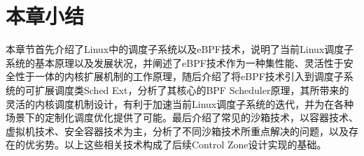 \section{本章小结}

本章节首先介绍了Linux中的调度子系统以及eBPF技术，说明了当前Linux调度子系统的基本原理以及发展状况，并阐述了eBPF技术作为一种集性能、灵活性于安全性于一体的内核扩展机制的工作原理，随后介绍了将eBPF技术引入到调度子系统的可扩展调度类Sched Ext，分析了其核心的BPF Scheduler原理，其所带来的灵活的内核调度机制设计，有利于加速当前Linux调度子系统的迭代，并为在各种场景下的定制化调度优化提供了可能。最后介绍了常见的沙箱技术，以容器技术、虚拟机技术、安全容器技术为主，分析了不同沙箱技术所重点解决的问题，以及存在的优劣势。以上这些相关技术构成了后续Control Zone设计实现的基础。
